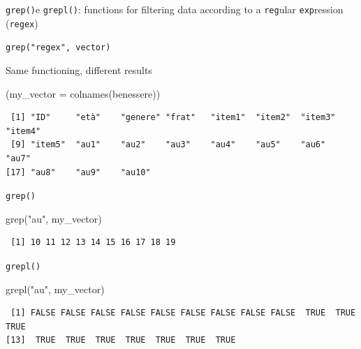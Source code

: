 \documentclass[
  ignorenonframetext,
]{beamer}
\newenvironment{Shaded}{\begin{snugshade}}{\end{snugshade}}
\newcommand{\AttributeTok}[1]{\textcolor[rgb]{0.00,0.34,0.68}{#1}}
\newcommand{\FunctionTok}[1]{\textcolor[rgb]{0.39,0.29,0.61}{#1}}
\newcommand{\NormalTok}[1]{\textcolor[rgb]{0.12,0.11,0.11}{#1}}
\newcommand{\StringTok}[1]{\textcolor[rgb]{0.75,0.01,0.01}{#1}}
\begin{document}
\begin{frame}[fragile]{}
\protect\hypertarget{section-1}{}
\texttt{grep()}e \texttt{grepl()}: functions for filtering data
according to a \texttt{reg}ular \texttt{exp}ression (\texttt{regex})

\begin{center}
\texttt{grep("regex", vector)}
\end{center}

Same functioning, different results

\footnotesize

\begin{Shaded}
\begin{Highlighting}[]
\NormalTok{(}\AttributeTok{my\_vector =} \FunctionTok{colnames}\NormalTok{(benessere))}
\end{Highlighting}
\end{Shaded}

\begin{verbatim}
 [1] "ID"     "età"    "genere" "frat"   "item1"  "item2"  "item3"  "item4" 
 [9] "item5"  "au1"    "au2"    "au3"    "au4"    "au5"    "au6"    "au7"   
[17] "au8"    "au9"    "au10"  
\end{verbatim}

\texttt{grep()}

\begin{Shaded}
\begin{Highlighting}[]
\FunctionTok{grep}\NormalTok{(}\StringTok{"au"}\NormalTok{, my\_vector)}
\end{Highlighting}
\end{Shaded}

\begin{verbatim}
 [1] 10 11 12 13 14 15 16 17 18 19
\end{verbatim}

\texttt{grepl()}

\begin{Shaded}
\begin{Highlighting}[]
\FunctionTok{grepl}\NormalTok{(}\StringTok{"au"}\NormalTok{, my\_vector)}
\end{Highlighting}
\end{Shaded}

\begin{verbatim}
 [1] FALSE FALSE FALSE FALSE FALSE FALSE FALSE FALSE FALSE  TRUE  TRUE  TRUE
[13]  TRUE  TRUE  TRUE  TRUE  TRUE  TRUE  TRUE
\end{verbatim}
\end{frame}
\end{document}
